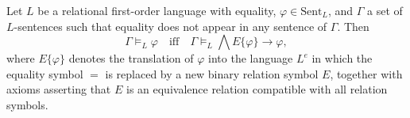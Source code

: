 Let $L$ be a relational first-order language with equality, $\varphi \in \text{Sent}_{L}$, and $\Gamma$ a set of $L$-sentences such that equality does not appear in any sentence of $\Gamma$. Then
$$\Gamma \models_{L} \varphi \quad \text{iff} \quad \Gamma \models_{L} \bigwedge E\{\varphi\} \rightarrow \varphi,$$
where $E\{\varphi\}$ denotes the translation of $\varphi$ into the language $L^{e}$ in which the equality symbol $=$ is replaced by a new binary relation symbol $E$, together with axioms asserting that $E$ is an equivalence relation compatible with all relation symbols.
